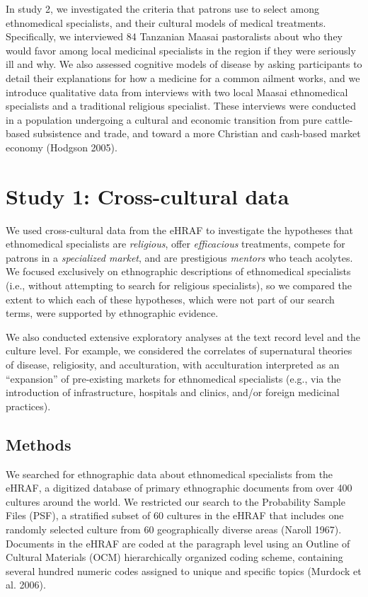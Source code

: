 \documentclass[
  11pt,
]{article}
\begin{document}
In study 2, we investigated the criteria that patrons use to select among ethnomedical specialists, and their cultural models of medical treatments. Specifically, we interviewed 84 Tanzanian Maasai pastoralists about who they would favor among local medicinal specialists in the region if they were seriously ill and why. We also assessed cognitive models of disease by asking participants to detail their explanations for how a medicine for a common ailment works, and we introduce qualitative data from interviews with two local Maasai ethnomedical specialists and a traditional religious specialist. These interviews were conducted in a population undergoing a cultural and economic transition from pure cattle-based subsistence and trade, and toward a more Christian and cash-based market economy (Hodgson 2005).

\hypertarget{study-1-cross-cultural-data}{%
\section{Study 1: Cross-cultural data}\label{study-1-cross-cultural-data}}

We used cross-cultural data from the eHRAF to investigate the hypotheses that ethnomedical specialists are \emph{religious}, offer \emph{efficacious} treatments, compete for patrons in a \emph{specialized market}, and are prestigious \emph{mentors} who teach acolytes. We focused exclusively on ethnographic descriptions of ethnomedical specialists (i.e., without attempting to search for religious specialists), so we compared the extent to which each of these hypotheses, which were not part of our search terms, were supported by ethnographic evidence.

We also conducted extensive exploratory analyses at the text record level and the culture level. For example, we considered the correlates of supernatural theories of disease, religiosity, and acculturation, with acculturation interpreted as an ``expansion'' of pre-existing markets for ethnomedical specialists (e.g., via the introduction of infrastructure, hospitals and clinics, and/or foreign medicinal practices).

\hypertarget{methods}{%
\subsection{Methods}\label{methods}}

We searched for ethnographic data about ethnomedical specialists from the eHRAF, a digitized database of primary ethnographic documents from over 400 cultures around the world. We restricted our search to the Probability Sample Files (PSF), a stratified subset of 60 cultures in the eHRAF that includes one randomly selected culture from 60 geographically diverse areas (Naroll 1967). Documents in the eHRAF are coded at the paragraph level using an Outline of Cultural Materials (OCM) hierarchically organized coding scheme, containing several hundred numeric codes assigned to unique and specific topics (Murdock et al. 2006).
\end{document}
